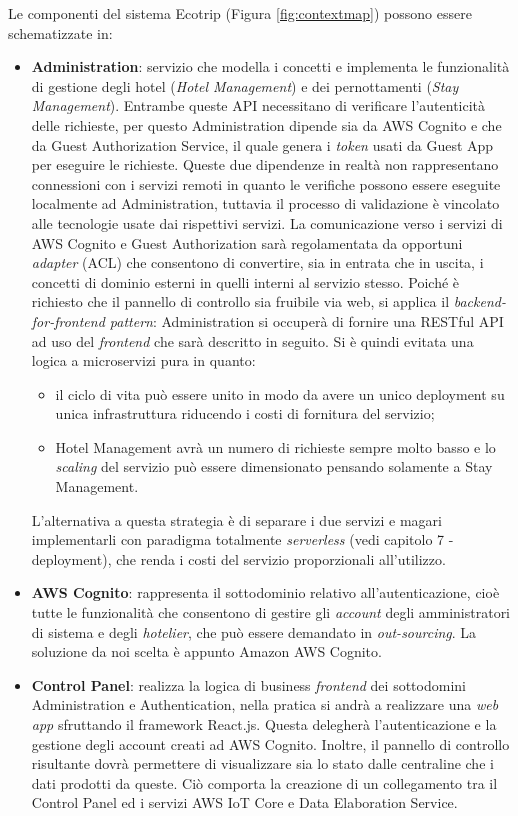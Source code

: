 Le componenti del sistema Ecotrip (Figura \ref{fig:contextmap}) possono essere schematizzate in:
\begin{itemize}
    \item \textbf{Administration}: servizio che modella  i concetti e implementa le funzionalità di gestione degli hotel (\textit{Hotel Management}) e dei pernottamenti (\textit{Stay Management}).  Entrambe queste API necessitano di verificare l'autenticità delle richieste, per questo Administration dipende sia da AWS Cognito e che da Guest Authorization Service, il quale genera i \textit{token} usati da Guest App per eseguire le richieste. Queste due dipendenze in realtà non rappresentano connessioni con i servizi remoti in quanto le verifiche possono essere eseguite localmente ad Administration, tuttavia il processo di validazione è vincolato alle tecnologie usate dai rispettivi servizi. La comunicazione verso i servizi di AWS Cognito e Guest Authorization sarà regolamentata da opportuni \textit{adapter} (ACL) che consentono di convertire, sia in entrata che in uscita, i concetti di dominio esterni in quelli interni al servizio stesso.  
    Poiché è richiesto che il pannello di controllo sia fruibile via web, si applica il \textit{backend-for-frontend pattern}: Administration si occuperà di fornire una RESTful API ad uso del \textit{frontend} che sarà descritto in seguito.
    Si è quindi evitata una logica a microservizi pura in quanto:
    \begin{itemize}
        \item il ciclo di vita può essere unito in modo da avere un unico deployment su unica infrastruttura riducendo i costi di fornitura del servizio;
        \item Hotel Management avrà un numero di richieste sempre molto basso e lo \textit{scaling} del servizio può essere dimensionato pensando solamente a Stay Management.
    \end{itemize}
    L'alternativa a questa strategia è di separare i due servizi e magari implementarli con paradigma totalmente \textit{serverless} (vedi capitolo 7 - deployment), che renda i costi del servizio proporzionali all'utilizzo.
    \item \textbf{AWS Cognito}: rappresenta il sottodominio relativo all'autenticazione, cioè tutte le funzionalità che consentono di gestire gli \textit{account} degli amministratori di sistema e degli \textit{hotelier}, che può essere demandato in \textit{out-sourcing}. La soluzione da noi scelta è appunto Amazon AWS Cognito.
    \item \textbf{Control Panel}: realizza la logica di business \textit{frontend} dei sottodomini Administration e Authentication, nella pratica si andrà a realizzare una \textit{web app} sfruttando il framework React.js. Questa delegherà l'autenticazione e la gestione degli account creati ad AWS Cognito. Inoltre, il pannello di controllo risultante dovrà permettere di visualizzare sia lo stato dalle centraline che i dati prodotti da queste. Ciò comporta la creazione di un collegamento tra il Control Panel ed i servizi AWS IoT Core e Data Elaboration Service.

\end{itemize}
